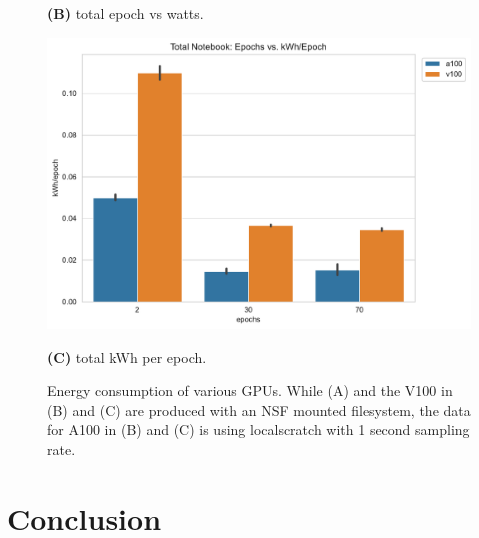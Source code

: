 \documentclass[utf8]{FrontiersinVancouver} %
\begin{document}
{\begin{figure}[htb]
\begin{center}
        {\bf (B)} total epoch vs watts.

         \includegraphics[height=0.29\textheight]{images/total_kWh_per_epoch.pdf}

         {\bf (C)}  total kWh per epoch.

  \end{center}

  \caption{Energy consumption of various GPUs. While (A) and the V100
    in (B) and (C) are produced with an NSF mounted filesystem, the
    data for A100 in (B) and (C) is using localscratch with 1 second sampling rate.} 
  \label{fig:energy-graphs-compare}
\end{figure}



\section{Conclusion}

}
\end{document}
